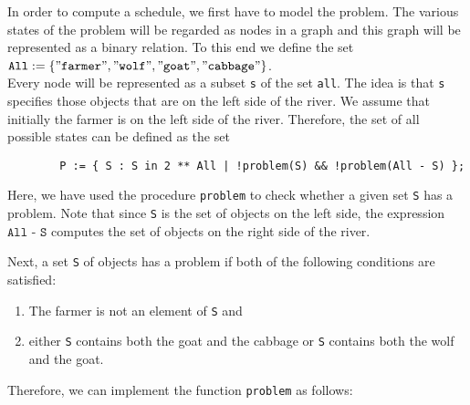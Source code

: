 \noindent
In order to compute a schedule, we first have to model the problem.  The various states of the problem will
be regarded as nodes in a graph and this graph will be represented as a binary relation.
To this end we define the set
\\[0.2cm]
\hspace*{1.3cm} 
$\texttt{All} := \{ \squote{farmer}, \squote{wolf}, \squote{goat},\squote{cabbage} \}$.
\\[0.2cm]
Every node will be represented as a subset \texttt{s} of the set \texttt{all}.  The idea is that \texttt{s}
specifies those objects that are on the left side of the river.  We assume that initially the farmer
is on the left side of the river. 
Therefore, the set of all possible states can be defined as the set
\begin{verbatim}
        P := { S : S in 2 ** All | !problem(S) && !problem(All - S) };
\end{verbatim}
Here, we have used the procedure \texttt{problem} to check whether a given set \texttt{S} has a problem. 
Note that since \texttt{S} is the set of objects on the left side, the expression $\texttt{All - S}$
computes the set of objects on the right side of the river.

Next, a set \texttt{S} of objects has a problem if both of the following conditions
are satisfied:
\begin{enumerate}
\item The farmer is not an element of \texttt{S} and
\item either \texttt{S} contains both the goat and the cabbage or \texttt{S} contains both the wolf and the goat.
\end{enumerate}
Therefore, we can implement the function \texttt{problem} as follows:

